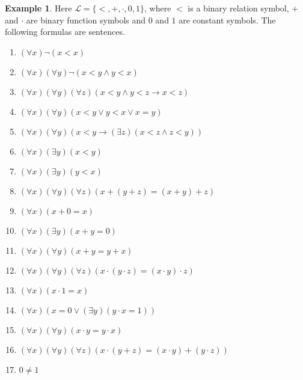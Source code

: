 \documentclass[titlepage, oneside]{amsbook}
\theoremstyle{plain}
\theoremstyle{definition}
\newtheorem{examples}{Example}
\theoremstyle{remark}
\begin{document}
\begin{examples}\label{X:theory} Here $\mathcal{L} = \{ < , + ,
\cdot ,
0 , 1 \}$, where $<$ is a binary relation symbol, $+$ and $\cdot$ are
binary function symbols
and $0$ and $1$ are constant symbols.  The following  
formulas are sentences.

\begin{enumerate}
\item $(\forall x) \neg (x < x)$

\item $(\forall x)( \forall y ) \neg (x <y \wedge y < x  )$

\item $(\forall x)(\forall y)(\forall z ) ( x < y \wedge y < z \to x
< z)$

\item  $(\forall x )(\forall y  ) (x < y \vee y < x \vee x = y)$

\item  $(\forall x)(\forall y ) ( x < y  \to ( 
\exists z) (x < z  \wedge z < y))$

\item $(\forall x ) (\exists y) ( x < y)$

\item $(\forall x) (\exists y) (y < x)$
\item $ (\forall x)(\forall y)(\forall z)( x+(y+z) = (x+y)+z
) $
\item $(\forall x) (x+0 =x)$
\item $(\forall x) (\exists y) (x+y = 0 )$

\item $ (\forall x) (\forall y) (x+y = y+x)$


\item $(\forall x)(\forall y)(\forall z) (x \cdot (y \cdot z)
= (x 
\cdot y) \cdot z)$

\item $(\forall x) (x \cdot 1 = x )$


\item $(\forall x ) ( x = 0 \vee (\exists y) (y 
\cdot x  = 1 ))$


\item $(\forall x)(\forall y) (x \cdot y = y \cdot x)$

\item $(\forall x)(\forall y)(\forall z ) ( x \cdot (y+z) = (x
\cdot y) + (y 
\cdot z) )$


\item $0  \neq 1$




\end{enumerate}
\end{examples}
\end{document}
